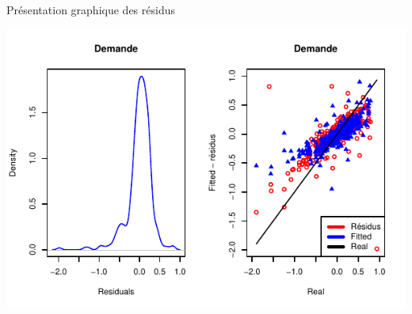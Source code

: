 \documentclass[11pt,ignorenonframetext,]{beamer}
\begin{document}
\begin{frame}{Présentation graphique des résidus}
\protect\hypertarget{presentation-graphique-des-residus}{}

\tiny

\begin{center}\includegraphics{Presentation_files/figure-beamer/unnamed-chunk-46-1} \end{center}

\normalsize

\tiny

\normalsize

\end{frame}
\end{document}
